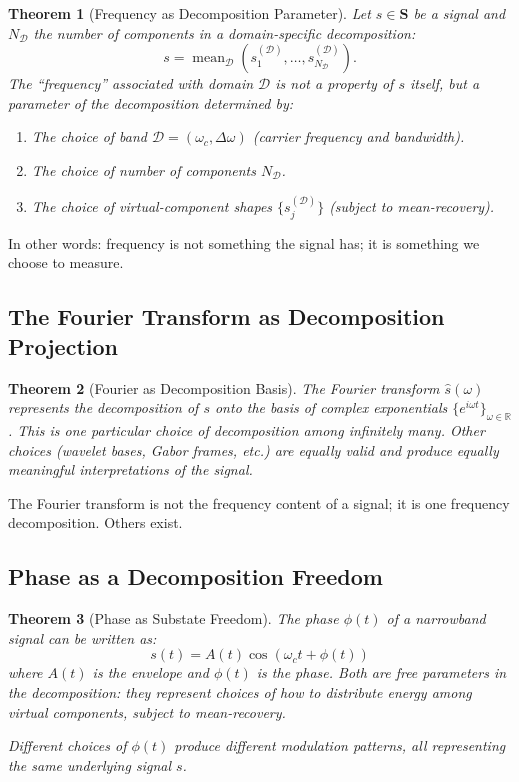 \documentclass[twocolumn,11pt,a4paper]{article}
\newtheorem{theorem}{Theorem}[section]
\newcommand{\signal}{s}
\newcommand{\Signal}{\mathbf{S}}
\newcommand{\bandwidth}{\Delta{\omega}}
\newcommand{\domain}{\mathcal{D}}
\newcommand{\mean}{\operatorname{mean}}
\newcommand{\freq}{\omega}
\begin{document}
\begin{theorem}[Frequency as Decomposition Parameter]
Let $\signal \in \Signal$ be a signal and $N_\domain$ the number of components in a domain-specific decomposition:
\begin{equation}
  \signal = \mean_\domain(\signal_1^{(\domain)}, \ldots, \signal_{N_\domain}^{(\domain)}).
\end{equation}
The ``frequency'' associated with domain $\domain$ is not a property of $\signal$ itself, but a parameter of the decomposition determined by:
\begin{enumerate}[nosep,label=(\roman*)]
  \item The choice of band $\domain = (\freq_c, \bandwidth)$ (carrier frequency and bandwidth).
  \item The choice of number of components $N_\domain$.
  \item The choice of virtual-component shapes $\{\signal_j^{(\domain)}\}$ (subject to mean-recovery).
\end{enumerate}
\end{theorem}

In other words: frequency is not something the signal has; it is something we choose to measure.

\subsection{The Fourier Transform as Decomposition Projection}

\begin{theorem}[Fourier as Decomposition Basis]
The Fourier transform $\hat{\signal}(\freq)$ represents the decomposition of $\signal$ onto the basis of complex exponentials $\{e^{i\freq t}\}_{\freq \in \mathbb{R}}$. This is one particular choice of decomposition among infinitely many. Other choices (wavelet bases, Gabor frames, etc.) are equally valid and produce equally meaningful interpretations of the signal.
\end{theorem}

The Fourier transform is not the frequency content of a signal; it is one frequency decomposition. Others exist.

\subsection{Phase as a Decomposition Freedom}

\begin{theorem}[Phase as Substate Freedom]
The phase $\phi(t)$ of a narrowband signal can be written as:
\begin{equation}
  \signal(t) = A(t) \cos(\freq_c t + \phi(t))
\end{equation}
where $A(t)$ is the envelope and $\phi(t)$ is the phase. Both are free parameters in the decomposition: they represent choices of how to distribute energy among virtual components, subject to mean-recovery.

Different choices of $\phi(t)$ produce different modulation patterns, all representing the same underlying signal $\signal$.
\end{theorem}
\end{document}
